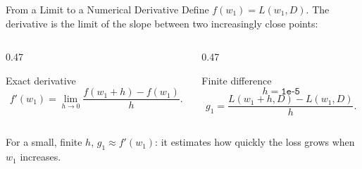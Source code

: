 \documentclass[aspectratio=169]{beamer}
\begin{document}
\begin{frame}{From a Limit to a Numerical Derivative}
  Define $f(w_1) = L(w_1, D)$. The derivative is the limit of the slope
  between two increasingly close points:

  \begin{columns}[T]
    \begin{column}{0.47\textwidth}
      \begin{block}{Exact derivative}
        \begin{equation*}
          f'(w_1)
          =
          \lim_{h \to 0}
          \frac{f(w_1 + h) - f(w_1)}{h}.
        \end{equation*}
      \end{block}
    \end{column}
    \begin{column}{0.47\textwidth}
      \begin{block}{Finite difference}
        \begin{equation*}
          h = \texttt{1e-5}
        \end{equation*}
        \begin{equation*}
          g_1
          =
          \frac{L(w_1 + h, D) - L(w_1, D)}{h}.
        \end{equation*}
      \end{block}
    \end{column}
  \end{columns}

  For a small, finite $h$, $g_1 \approx f'(w_1)$: it estimates how quickly
  the loss grows when $w_1$ increases.
\end{frame}
\end{document}
